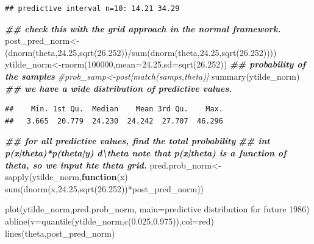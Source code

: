\documentclass[
]{book}
\newenvironment{Shaded}{\begin{snugshade}}{\end{snugshade}}
\newcommand{\AttributeTok}[1]{\textcolor[rgb]{0.77,0.63,0.00}{#1}}
\newcommand{\CommentTok}[1]{\textcolor[rgb]{0.56,0.35,0.01}{\textit{#1}}}
\newcommand{\ControlFlowTok}[1]{\textcolor[rgb]{0.13,0.29,0.53}{\textbf{#1}}}
\newcommand{\DecValTok}[1]{\textcolor[rgb]{0.00,0.00,0.81}{#1}}
\newcommand{\DocumentationTok}[1]{\textcolor[rgb]{0.56,0.35,0.01}{\textbf{\textit{#1}}}}
\newcommand{\FloatTok}[1]{\textcolor[rgb]{0.00,0.00,0.81}{#1}}
\newcommand{\FunctionTok}[1]{\textcolor[rgb]{0.00,0.00,0.00}{#1}}
\newcommand{\NormalTok}[1]{#1}
\newcommand{\OtherTok}[1]{\textcolor[rgb]{0.56,0.35,0.01}{#1}}
\newcommand{\SpecialCharTok}[1]{\textcolor[rgb]{0.00,0.00,0.00}{#1}}
\newcommand{\StringTok}[1]{\textcolor[rgb]{0.31,0.60,0.02}{#1}}
\theoremstyle{definition}
\theoremstyle{definition}
\theoremstyle{definition}
\theoremstyle{definition}
\theoremstyle{remark}
\begin{document}
\begin{verbatim}
## predictive interval n=10: 14.21 34.29
\end{verbatim}

\begin{Shaded}
\begin{Highlighting}[]
   \DocumentationTok{\#\# check this with the grid approach in the normal framework.  }
\NormalTok{  post\_pred\_norm}\OtherTok{\textless{}{-}}\NormalTok{(}\FunctionTok{dnorm}\NormalTok{(theta,}\FloatTok{24.25}\NormalTok{,}\FunctionTok{sqrt}\NormalTok{(}\FloatTok{26.252}\NormalTok{))}\SpecialCharTok{/}\FunctionTok{sum}\NormalTok{(}\FunctionTok{dnorm}\NormalTok{(theta,}\FloatTok{24.25}\NormalTok{,}\FunctionTok{sqrt}\NormalTok{(}\FloatTok{26.252}\NormalTok{))))}
\NormalTok{   ytilde\_norm}\OtherTok{\textless{}{-}}\FunctionTok{rnorm}\NormalTok{(}\DecValTok{100000}\NormalTok{,}\AttributeTok{mean=}\FloatTok{24.25}\NormalTok{,}\AttributeTok{sd=}\FunctionTok{sqrt}\NormalTok{(}\FloatTok{26.252}\NormalTok{)) }
 \DocumentationTok{\#\# probability of the samples }
 \CommentTok{\#prob\_samp\textless{}{-}post[match(samps,theta)]}
  \FunctionTok{summary}\NormalTok{(ytilde\_norm) }\DocumentationTok{\#\# we have a wide distribution of predictive values.}
\end{Highlighting}
\end{Shaded}

\begin{verbatim}
##    Min. 1st Qu.  Median    Mean 3rd Qu.    Max. 
##   3.665  20.779  24.230  24.242  27.707  46.296
\end{verbatim}

\begin{Shaded}
\begin{Highlighting}[]
\DocumentationTok{\#\# for all predictive values,  find the total probability  }
   \DocumentationTok{\#\# int p(x|theta)*p(theta|y) d\textbackslash{}theta  note that p(x|theta) is a function of theta, so we input hte theta grid.}
\NormalTok{ pred.prob\_norm}\OtherTok{\textless{}{-}}\FunctionTok{sapply}\NormalTok{(ytilde\_norm,}\ControlFlowTok{function}\NormalTok{(x) }\FunctionTok{sum}\NormalTok{(}\FunctionTok{dnorm}\NormalTok{(x,}\FloatTok{24.25}\NormalTok{,}\FunctionTok{sqrt}\NormalTok{(}\FloatTok{26.252}\NormalTok{))}\SpecialCharTok{*}\NormalTok{post\_pred\_norm))  }
  
 \FunctionTok{plot}\NormalTok{(ytilde\_norm,pred.prob\_norm, }\AttributeTok{main=}\StringTok{\textquotesingle{}predictive distribution for future 1986\textquotesingle{}}\NormalTok{)}
 \FunctionTok{abline}\NormalTok{(}\AttributeTok{v=}\FunctionTok{quantile}\NormalTok{(ytilde\_norm,}\FunctionTok{c}\NormalTok{(}\FloatTok{0.025}\NormalTok{,}\FloatTok{0.975}\NormalTok{)),}\AttributeTok{col=}\StringTok{\textquotesingle{}red\textquotesingle{}}\NormalTok{)}
 \FunctionTok{lines}\NormalTok{(theta,post\_pred\_norm)}
\end{Highlighting}
\end{Shaded}
\end{document}
